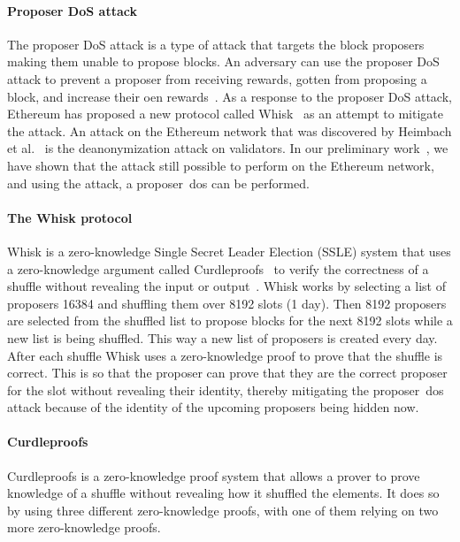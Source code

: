 \paragraph*{\textbf{Proposer DoS attack}}\label{sec:background-proposer-DoS-attacks}
The proposer DoS attack is a type of attack that targets the block proposers making them unable to propose blocks.
An adversary can use the proposer DoS attack to prevent a proposer from receiving rewards, gotten from proposing a block, and increase their oen rewards~\cite{EthereumSSLE2024}.
As a response to the proposer DoS attack, Ethereum has proposed a new protocol called Whisk~\cite{Whisk2024} as an attempt to mitigate the attack.
An attack on the Ethereum network that was discovered by Heimbach et al.~\cite{heimbach2024deanonymizingethereumvalidatorsp2p} is the deanonymization attack on validators.
In our preliminary work~\cite{ouroldpaper}, we have shown that the attack still possible to perform on the Ethereum network, and using the attack, a proposer~\gls{dos} can be performed.


\paragraph*{\textbf{The Whisk protocol}}\label{sec:background-mitigation}
Whisk is a zero-knowledge Single Secret Leader Election (SSLE) system that uses a zero-knowledge argument called Curdleproofs~\cite{Curdleproofs} to verify the correctness of a shuffle without revealing the input or output~\cite{10.1145/3419614.3423258}.
Whisk works by selecting a list of proposers 16384 and shuffling them over 8192 slots (1 day).
Then 8192 proposers are selected from the shuffled list to propose blocks for the next 8192 slots while a new list is being shuffled.
This way a new list of proposers is created every day.
After each shuffle Whisk uses a zero-knowledge proof to prove that the shuffle is correct.
This is so that the proposer can prove that they are the correct proposer for the slot without revealing their identity, thereby mitigating the proposer~\gls{dos} attack because of the identity of the upcoming proposers being hidden now.

\paragraph*{\textbf{Curdleproofs}}\label{sec:background-curdleproofs}
Curdleproofs is a zero-knowledge proof system that allows a prover to prove knowledge of a shuffle without revealing how it shuffled the elements.
It does so by using three different zero-knowledge proofs, with one of them relying on two more zero-knowledge proofs.

